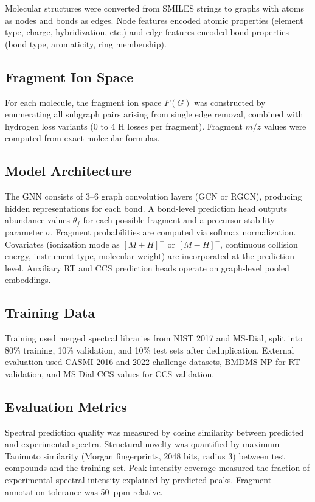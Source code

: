 \documentclass[11pt]{article}
\begin{document}
Molecular structures were converted from SMILES strings to graphs with atoms as nodes and bonds as edges. Node features encoded atomic properties (element type, charge, hybridization, etc.) and edge features encoded bond properties (bond type, aromaticity, ring membership).

\subsection{Fragment Ion Space}

For each molecule, the fragment ion space $F(G)$ was constructed by enumerating all subgraph pairs arising from single edge removal, combined with hydrogen loss variants (0 to 4 H losses per fragment). Fragment $m/z$ values were computed from exact molecular formulas.

\subsection{Model Architecture}

The GNN consists of 3--6 graph convolution layers (GCN or RGCN), producing hidden representations for each bond. A bond-level prediction head outputs abundance values $\theta_f$ for each possible fragment and a precursor stability parameter $\sigma$. Fragment probabilities are computed via softmax normalization. Covariates (ionization mode as $[M+H]^+$ or $[M-H]^-$, continuous collision energy, instrument type, molecular weight) are incorporated at the prediction level. Auxiliary RT and CCS prediction heads operate on graph-level pooled embeddings.

\subsection{Training Data}

Training used merged spectral libraries from NIST 2017 and MS-Dial, split into 80\% training, 10\% validation, and 10\% test sets after deduplication. External evaluation used CASMI 2016 and 2022 challenge datasets, BMDMS-NP for RT validation, and MS-Dial CCS values for CCS validation.

\subsection{Evaluation Metrics}

Spectral prediction quality was measured by cosine similarity between predicted and experimental spectra. Structural novelty was quantified by maximum Tanimoto similarity (Morgan fingerprints, 2048 bits, radius 3) between test compounds and the training set. Peak intensity coverage measured the fraction of experimental spectral intensity explained by predicted peaks. Fragment annotation tolerance was 50~ppm relative.
\end{document}
